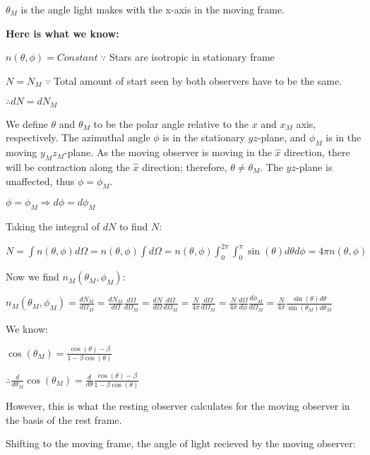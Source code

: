 \documentclass[11pt]{article}
\renewcommand{\paragraph}{\textbf}
\begin{document}
\(\theta_M\) is the angle light makes with the x-axis in the moving
frame.

    \hypertarget{here-is-what-we-know}{%
\paragraph{Here is what we know:}\label{here-is-what-we-know}}

\(n(\theta, \phi) = Constant\) \(\because\) Stars are isotropic in
stationary frame

\(N = N_M\) \(\because\) Total amount of start seen by both observers
have to be the same.

\(\therefore dN = dN_M\)

We define \(\theta\) and \(\theta_M\) to be the polar angle relative to
the \(x\) and \(x_M\) axis, respectively. The azimuthal angle \(\phi\)
is in the stationary \(yz\)-plane, and \(\phi_M\) is in the moving
\(y_Mz_M\)-plane. As the moving observer is moving in the \(\hat{x}\)
direction, there will be contraction along the \(\hat{x}\) direction;
therefore, \(\theta \neq \theta_M\). The \(yz\)-plane is unaffected,
thus \(\phi = \phi_M\).

\(\phi = \phi_M \Rightarrow d\phi = d\phi_M\)

    Taking the integral of \(dN\) to find \(N\):

\(N = \int n(\theta, \phi) d\Omega = n(\theta, \phi) \int d\Omega = n(\theta, \phi) \int_0^{2\pi} \int_0^{\pi} \sin(\theta) d\theta d\phi = 4\pi n(\theta, \phi)\)

Now we find \(n_M(\theta_M, \phi_M)\):

\(n_M(\theta_M, \phi_M) = \frac{dN_M}{d\Omega_M} = \frac{dN_M}{d\Omega} \frac{d\Omega}{d\Omega_M} = \frac{dN}{d\Omega} \frac{d\Omega}{d\Omega_M} = \frac{N}{4\pi} \frac{d\Omega}{d\Omega_M} = \frac{N}{4\pi} \frac{d\Omega}{d\phi} \frac{d\phi_M}{d\Omega_M} = \frac{N}{4\pi} \frac{\sin(\theta) d\theta}{\sin(\theta_M)d\theta_M}\)

    We know:

\(\cos(\theta_M) = \frac{\cos(\theta) - \beta}{1 - \beta \cos(\theta)}\)

\(\therefore \frac{d}{d \theta_M} \cos(\theta_M) = \frac{d}{d \theta} \frac{\cos(\theta) - \beta}{1 - \beta \cos(\theta)}\)

However, this is what the resting observer calculates for the moving
observer in the basis of the rest frame.

Shifting to the moving frame, the angle of light recieved by the moving
observer:
\end{document}
